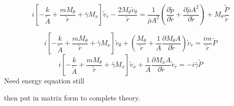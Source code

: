 \[ i\left[ 
- \frac{k}{\tilde{A}} + 
\frac{m M_{\theta}}{\tilde{r}} + 
\bar{\gamma} M_x 
\right] \tilde{v}_r - 
\frac{2 M_{\theta} \tilde{v}_{\theta}}{\tilde{r}} = 
\frac{1}{\bar{\rho} A^2}\left( \frac{\partial \tilde{p}}{\partial \tilde{r}} +
\frac{\partial \bar{\rho} A^2}{\partial \tilde{r}}  \right)+ 
M_{\theta}\frac{\tilde{P}}{\tilde{r}}\]


\[i\left[ - \frac{k}{\tilde{A}} + \frac{m M_{\theta}}{\tilde{r}} + \bar{\gamma} M_x \right] \tilde{v}_{\theta} + \left(\frac{ M_{\theta}}{\tilde{r}}  + \frac{1}{A} \frac{\partial M_{\theta}A}{\partial \tilde{r}}\right)\tilde{v}_r = \frac{i m}{\tilde{r}}\tilde{P}\]
\[i\left[ - \frac{k}{\tilde{A}} + \frac{m M_{\theta}}{\tilde{r}} + \bar{\gamma} M_x \right] \tilde{v}_x  + \frac{1}{A} \frac{\partial M_x A}{\partial \tilde{r}}\tilde{v}_r = -i \bar{\gamma}\tilde{P} \]
Need energy equation still


then put in matrix form to complete theory.
